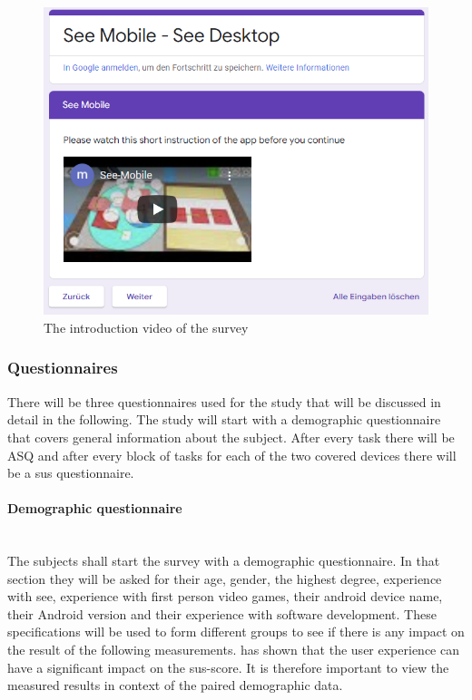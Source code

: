 \begin{figure}[H]
  \centering
  \includegraphics[width=1\textwidth]{Evaluation/img/form_video.png}
  \caption{The introduction video of the survey}\label{fig:video}
\end{figure}

\subsubsection{Questionnaires}
\label{questionaires}
There will be three questionnaires used for the study that will be discussed in detail in the following.
The study will start with a demographic questionnaire that covers general information about the subject.
After every task there will be \gls{ASQ} and after every block of tasks for each of the two covered devices there will be a \gls{sus} questionnaire.
\paragraph{Demographic questionnaire}\mbox{}\\
The subjects shall start the survey with a demographic questionnaire.
In that section they will be asked for their age, gender, the highest degree, experience with \gls{see}, experience with first person video games, their \gls{android} device name, their Android version and their experience with software development.
These specifications will be used to form different groups to see if there is any impact on the result of the following measurements. 
\cite{Mclellan2011} has shown that the user experience can have a significant impact on the \gls{sus}-score.
It is therefore important to view the measured results in context of the paired demographic data.

